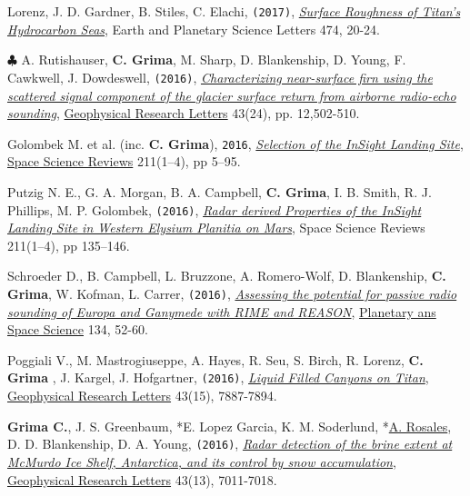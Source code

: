 \begin{etaremune}
  Lorenz, J. D. Gardner, B. Stiles, C. Elachi, \texttt{(2017)},
  \href{http://www.sciencedirect.com/science/article/pii/S0012821X17303163}{\emph{Surface
  Roughness of Titan's Hydrocarbon Seas}}, Earth and Planetary Science
  Letters 474, 20-24.
\item
  $\clubsuit$ A. Rutishauser, \textbf{C. Grima}, M. Sharp, D.
  Blankenship, D. Young, F. Cawkwell, J. Dowdeswell, \texttt{(2016)},
  \href{http://onlinelibrary.wiley.com/doi/10.1002/2016GL071230/full}{\emph{Characterizing
  near-surface firn using the scattered signal component of the glacier
  surface return from airborne radio-echo sounding}}, \ul{Geophysical
  Research Letters} 43(24), pp. 12,502-510.
\item
  Golombek M. et al. (inc. \textbf{C. Grima}), \texttt{2016},
  \href{http://link.springer.com/article/10.1007/s11214-016-0321-9?wt_mc=Internal.Event.1.SEM.ArticleAuthorOnlineFirst}{\emph{Selection
  of the InSight Landing Site}}, \ul{Space Science Reviews} 211(1–4), pp 5–95.
\item
  Putzig N. E., G. A. Morgan, B. A. Campbell, \textbf{C. Grima}, I. B.
  Smith, R. J. Phillips, M. P. Golombek, \texttt{(2016)},
  \href{http://link.springer.com/article/10.1007\%2Fs11214-016-0322-8}{\emph{Radar
  derived Properties of the InSight Landing Site in Western Elysium
  Planitia on Mars}}, Space Science Reviews 211(1–4), pp 135–146.
\item
  Schroeder D., B. Campbell, L. Bruzzone, A. Romero-Wolf, D.
  Blankenship, \textbf{C. Grima}, W. Kofman, L. Carrer, \texttt{(2016)},
  \href{http://www.sciencedirect.com/science/article/pii/S0032063316301465}{\emph{Assessing
  the potential for passive radio sounding of Europa and Ganymede with
  RIME and REASON}}, \ul{Planetary ans Space Science} 134,  52-60.
\item
  Poggiali V., M. Mastrogiuseppe, A. Hayes, R. Seu, S. Birch, R. Lorenz,
  \textbf{C. Grima }, J. Kargel, J. Hofgartner, \texttt{(2016)},
  \href{http://onlinelibrary.wiley.com/doi/10.1002/2016GL069679/abstract}{\emph{Liquid
  Filled Canyons on Titan}}, \ul{Geophysical Research Letters} 43(15), 7887-7894.
\item
  \textbf{Grima C.}, J. S. Greenbaum, *E. Lopez Garcia, K.
  M. Soderlund, *\ul{A. Rosales}, D. D. Blankenship, D. A. Young,
  \texttt{(2016)},
  \href{http://onlinelibrary.wiley.com/doi/10.1002/2016GL069524/pdf}{\emph{Radar
  detection of the brine extent at McMurdo Ice Shelf, Antarctica, and
  its control by snow accumulation}}, \ul{Geophysical Research Letters} 43(13), 7011-7018.

\end{etaremune}
